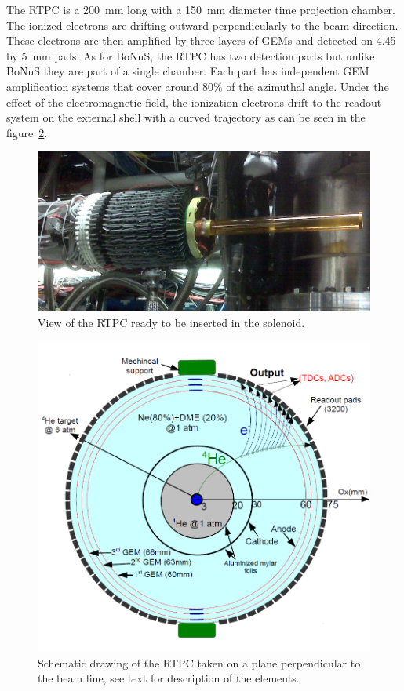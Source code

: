 \documentclass[reprint, amsmath,amssymb, aps]{revtex4}
\begin{document}
The RTPC is a 200~mm long with a 150~mm diameter time projection chamber. The ionized electrons are drifting outward perpendicularly to the beam direction. These electrons are then amplified by three layers of GEMs and detected on 4.45 by 5~mm pads. As for BoNuS, the RTPC has two detection parts but unlike BoNuS they are part of a single chamber. Each part has independent GEM amplification systems that cover around 80\% of the azimuthal angle. Under the effect of the electromagnetic field, the ionization electrons drift to the readout system on the external shell with a curved trajectory as can be seen in the figure~\ref{fig:RTPC_1_4}.

\begin{figure}[tb]
\centering
\includegraphics[scale=0.19]{fig/RTPC_exp.png}
\caption[]{\small\sf View of the RTPC ready to be inserted in the solenoid. } 
\label{fig:RTPC2}
\end{figure}

\begin{figure}[tb]
\centering
\includegraphics[scale=0.28]{fig/RTPC_1_all.png}
\caption[]{\small\sf Schematic drawing of the RTPC taken on a plane perpendicular to the beam line, see text for description of the elements.} 
\label{fig:RTPC_1_4}
\end{figure} 
\end{document}
